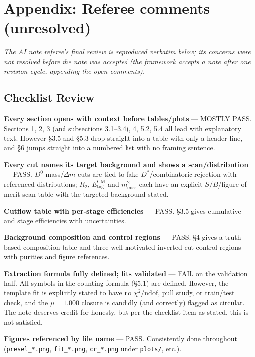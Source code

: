 \documentclass[11pt]{article}
\newcommand{\mmiss}{m^2_{\mathrm{miss}}}
\newcommand{\Etag}{E_{\mathrm{tag}}^{\mathrm{CM}}}
\begin{document}
\appendix
\section*{Appendix: Referee comments (unresolved)}

\emph{The AI note referee's final review is reproduced verbatim below;
its concerns were not resolved before the note was accepted (the
framework accepts a note after one revision cycle, appending the open
comments).}

\subsection*{Checklist Review}

\textbf{Every section opens with context before tables/plots} --- MOSTLY
PASS. Sections 1, 2, 3 (and subsections 3.1--3.4), 4, 5.2, 5.4 all lead
with explanatory text. However \S3.5 and \S5.3 drop straight into a table
with only a header line, and \S6 jumps straight into a numbered list with
no framing sentence.

\textbf{Every cut names its target background and shows a
scan/distribution} --- PASS. $D^0$-mass/$\Delta m$ cuts are tied to
fake-$D^{*}$/combinatoric rejection with referenced distributions;
$R_2$, $\Etag$ and $\mmiss$ each have an explicit $S/B$/figure-of-merit
scan table with the targeted background stated.

\textbf{Cutflow table with per-stage efficiencies} --- PASS. \S3.5 gives
cumulative and stage efficiencies with uncertainties.

\textbf{Background composition and control regions} --- PASS. \S4 gives a
truth-based composition table and three well-motivated inverted-cut
control regions with purities and figure references.

\textbf{Extraction formula fully defined; fits validated} --- FAIL on the
validation half. All symbols in the counting formula (\S5.1) are defined.
However, the template fit is explicitly stated to have no
$\chi^2/\mathrm{ndof}$, pull study, or train/test check, and the
$\mu=1.000$ closure is candidly (and correctly) flagged as circular. The
note deserves credit for honesty, but per the checklist item as stated,
this is not satisfied.

\textbf{Figures referenced by file name} --- PASS. Consistently done
throughout (\texttt{presel\_*.png}, \texttt{fit\_*.png},
\texttt{cr\_*.png} under \texttt{plots/}, etc.).
\end{document}
